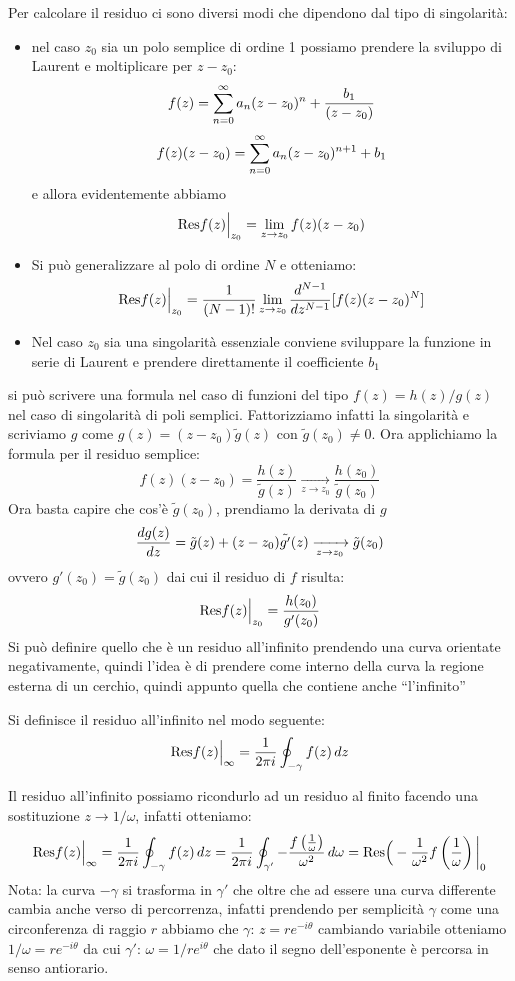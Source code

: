 Per calcolare il residuo ci sono diversi modi che dipendono dal tipo di singolarità:
\begin{itemize}
 \item  nel caso $z_0$ sia un polo semplice di ordine 1 possiamo prendere la sviluppo di Laurent e moltiplicare per $z-z_0$:
\[f(z) = \sum_{n=0}^\infty a_n(z-z_0)^{n} +\frac{b_1}{(z-z_0)} \]
\[f(z)(z-z_0) = \sum_{n=0}^\infty a_n(z-z_0)^{n+1} +b_1 \]
e allora evidentemente abbiamo
\[\text{Res}f(z)\Big|_{z_0} = \lim_{z\to z_0}f(z)(z-z_0)\]
\item Si può generalizzare al polo di ordine $N$ e otteniamo:
\[\text{Res}f(z)\Big|_{z_0} = \frac{1}{(N-1)!}\lim_{z\to z_0}\frac{d^{N-1}}{dz^{N-1}}[f(z)(z-z_0)^N]  \]
\item Nel caso $z_0$ sia una singolarità essenziale conviene sviluppare la funzione in serie di Laurent e prendere direttamente il coefficiente $b_1$
\end{itemize}
si può scrivere una formula nel caso di funzioni del tipo $f(z) = h(z)/g(z)$ nel caso di singolarità di poli semplici. Fattorizziamo infatti la singolarità e scriviamo $g$ come $g(z) = (z-z_0)\tilde{g}(z)$ con $\tilde{g}(z_0)\neq 0$. Ora applichiamo la formula per il residuo semplice:
\[f(z)(z-z_0) = \frac{h(z)}{\tilde{g}(z)}\xrightarrow[z\to z_0]{} \frac{h(z_0)}{\tilde{g}(z_0)} \]
Ora basta capire che cos'è $\tilde{g}(z_0)$, prendiamo la derivata di $g$
\[\frac{d g(z)}{d z} = \tilde{g}(z) + (z-z_0)\tilde{g'}(z)\xrightarrow[z\to z_0]{} \tilde{g}(z_0)\]
ovvero $g'(z_0) = \tilde{g}(z_0)$ dai cui il residuo di $f$ risulta:
\[\text{Res}f(z)\Big|_{z_0} = \frac{h(z_0)}{g'(z_0)}\]
Si può definire quello che è un residuo all'infinito prendendo una curva orientate negativamente, quindi l'idea è di prendere come interno della curva la regione esterna di un cerchio, quindi appunto quella che contiene anche ``l'infinito''
\begin{dfn}
Si definisce il residuo all'infinito nel modo seguente:
\[\text{Res}f(z)\Big|_{\infty}=\frac{1}{2\pi i}\oint_{-\gamma}f(z)\,dz\]
\end{dfn}
Il residuo all'infinito possiamo ricondurlo ad un residuo al finito facendo una sostituzione $z\to 1/\omega$, infatti otteniamo:
\[\text{Res}f(z)\Big|_{\infty}=\frac{1}{2\pi i}\oint_{-\gamma}f(z)\,dz = \frac{1}{2\pi i}\oint_{\gamma'}-\frac{f\left(\frac{1}{\omega}\right)}{\omega^2}\,d\omega = \text{Res}\Big(-\frac{1}{\omega^2}f\left(\frac{1}{\omega}\right)\bigg|_{0} \]
Nota: la curva $-\gamma$ si trasforma in $\gamma'$ che oltre che ad essere una curva differente cambia anche verso di percorrenza, infatti prendendo per semplicità $\gamma$ come una circonferenza di raggio $r$ abbiamo che $\gamma:\, z = re^{-i\theta}$ cambiando variabile otteniamo $1/\omega = re^{-i\theta} $ da cui $\gamma':\, \omega =1/r e^{i\theta}$ che dato il segno dell'esponente è percorsa in senso antiorario.
